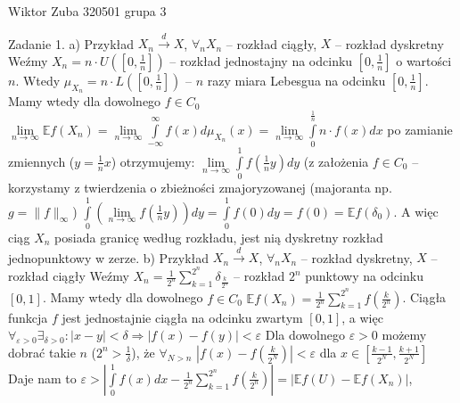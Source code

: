 \documentclass{article}
\begin{document}
Wiktor Zuba 320501 grupa 3
\newline

Zadanie 1.
\newline
a) Przykład $X_n\xrightarrow{d} X$, $\forall_n X_n$ -- rozkład ciągły, $X$ -- rozkład dyskretny\newline\newline
Weźmy $X_n=n\cdot U([0,\frac{1}{n}])$ -- rozkład jednostajny na odcinku $[0,\frac{1}{n}]$ o wartości $n$.\newline
Wtedy $\mu_{X_n}=n\cdot L([0,\frac{1}{n}])$ -- $n$ razy miara Lebesgua na odcinku $[0,\frac{1}{n}]$.\newline
Mamy wtedy dla dowolnego $f\in C_0$ $\lim\limits_{n\rightarrow\infty}\mathbb{E}f(X_n)=\lim\limits_{n\rightarrow\infty}\int\limits_{-\infty}^{\infty}f(x)d\mu_{X_n}(x)=
\lim\limits_{n\rightarrow\infty}\int\limits_{0}^{\frac{1}{n}}n\cdot f(x)dx$\newline
po zamianie zmiennych ($y=\frac{1}{n}x$) otrzymujemy:
$\lim\limits_{n\rightarrow\infty}\int\limits_{0}^{1}f(\frac{1}{n}y)dy$ (z założenia $f\in C_0$ -- korzystamy z twierdzenia o zbieżności zmajoryzowanej (majoranta np. $g=\lVert f\rVert_\infty$)
$\int\limits_{0}^{1}(\lim\limits_{n\rightarrow\infty}f(\frac{1}{n}y))dy=\int\limits_{0}^{1}f(0)dy=f(0)=\mathbb{E}f(\delta_0)$.\newline
A więc ciąg $X_n$ posiada granicę według rozkładu, jest nią dyskretny rozkład jednopunktowy w zerze.
\newline\newline
b) Przykład $X_n\xrightarrow{d} X$, $\forall_n X_n$ -- rozkład dyskretny, $X$ -- rozkład ciągły\newline
Weźmy $X_n=\frac{1}{2^n}\sum\limits_{k=1}^{2^n}\delta_{\frac{k}{2^n}}$ -- rozkład $2^n$ punktowy na odcinku $[0,1]$.\newline\newline
Mamy wtedy dla dowolnego $f\in C_0$ $\mathbb{E}f(X_n)=\frac{1}{2^n}\sum\limits_{k=1}^{2^n}f(\frac{k}{2^n})$.\newline
Ciągła funkcja $f$ jest jednostajnie ciągła na odcinku zwartym $[0,1]$, a więc $\forall_{\varepsilon>0}\exists_{\delta>0}:|x-y|<\delta\Rightarrow|f(x)-f(y)|<\varepsilon$\newline
Dla dowolnego $\varepsilon>0$ możemy dobrać takie $n$ ($2^n>\frac{1}{\delta}$), że $\forall_{N>n}$ $|f(x)-f(\frac{k}{2^N})|<\varepsilon$ dla $x\in[\frac{k-1}{2^N},\frac{k+1}{2^N}]$\newline
Daje nam to $\varepsilon>|\int\limits_{0}^{1}f(x)dx-\frac{1}{2^n}\sum\limits_{k=1}^{2^n}f(\frac{k}{2^n})|=|\mathbb{E}f(U)-\mathbb{E}f(X_n)|$,
\end{document}
